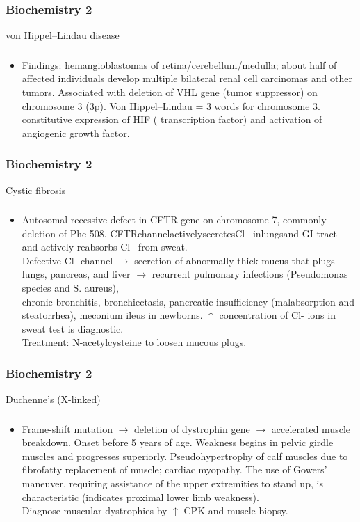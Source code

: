 \documentclass[11pt]{beamer}
\begin{document}
\begin{frame}
 \frametitle{Biochemistry 2}
von Hippel–Lindau disease
\end{frame}

\begin{frame}
 \frametitle{}
\begin{itemize}
\item Findings: hemangioblastomas of retina/cerebellum/medulla; about half of affected individuals develop multiple bilateral renal cell carcinomas and other tumors. Associated with deletion of VHL gene (tumor suppressor) on chromosome 3 (3p). Von Hippel–Lindau = 3 words for chromosome 3. \\ constitutive expression of HIF ( transcription factor) and activation of angiogenic growth factor. 
\end{itemize}
\end{frame}

\begin{frame}
 \frametitle{Biochemistry 2}
Cystic fibrosis
\end{frame}

\begin{frame}
 \frametitle{}
\begin{itemize}
\item Autosomal-recessive defect in CFTR gene on chromosome 7, commonly deletion of Phe 508. CFTRchannelactivelysecretesCl– inlungsand GI tract and actively reabsorbs Cl– from sweat. \\ Defective Cl- channel ${\rightarrow}$ secretion of abnormally thick mucus that plugs lungs, pancreas, and liver ${\rightarrow}$ recurrent pulmonary infections (Pseudomonas species and S. aureus), \\ chronic bronchitis, bronchiectasis, pancreatic insufficiency (malabsorption and steatorrhea), meconium ileus in newborns. ${\uparrow}$ concentration of Cl- ions in sweat test is diagnostic. \\ Treatment: N-acetylcysteine to loosen mucous plugs.
\end{itemize}
\end{frame}

\begin{frame}
 \frametitle{Biochemistry 2}
Duchenne’s (X-linked)
\end{frame}

\begin{frame}
 \frametitle{}
\begin{itemize}
\item Frame-shift mutation ${\rightarrow}$ deletion of dystrophin gene ${\rightarrow}$ accelerated muscle breakdown. Onset before 5 years of age. Weakness begins in pelvic girdle muscles and progresses superiorly. Pseudohypertrophy of calf muscles due to fibrofatty replacement of muscle; cardiac myopathy. The use of Gowers’ maneuver, requiring assistance of the upper extremities to stand up, is characteristic (indicates proximal lower limb weakness). \\ Diagnose muscular dystrophies by ${\uparrow}$ CPK and muscle biopsy.
\end{itemize}
\end{frame}
\end{document}
